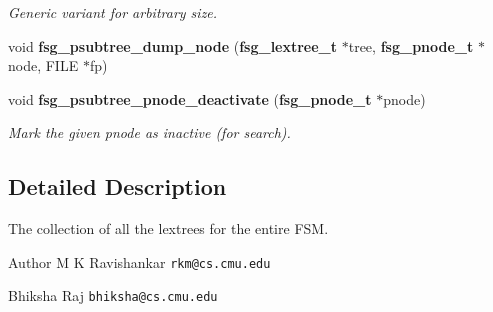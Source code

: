 \begin{DoxyCompactItemize}
\begin{DoxyCompactList}\small\item\em Generic variant for arbitrary size. \end{DoxyCompactList}\item 
void {\bfseries fsg\+\_\+psubtree\+\_\+dump\+\_\+node} ({\bf fsg\+\_\+lextree\+\_\+t} $\ast$tree, {\bf fsg\+\_\+pnode\+\_\+t} $\ast$node, F\+I\+L\+E $\ast$fp)\label{fsg__lextree_8c_a1d3204e8ce39bcb66c68b9ef1e2acb7d}

\item 
void {\bf fsg\+\_\+psubtree\+\_\+pnode\+\_\+deactivate} ({\bf fsg\+\_\+pnode\+\_\+t} $\ast$pnode)\label{fsg__lextree_8c_a6dc55ff3873855fb7b2c0390aa072516}

\begin{DoxyCompactList}\small\item\em Mark the given pnode as inactive (for search). \end{DoxyCompactList}\end{DoxyCompactItemize}


\subsection{Detailed Description}
The collection of all the lextrees for the entire F\+S\+M. 

\begin{DoxyAuthor}{Author}
M K Ravishankar {\tt rkm@cs.\+cmu.\+edu} 

Bhiksha Raj {\tt bhiksha@cs.\+cmu.\+edu} 
\end{DoxyAuthor}

